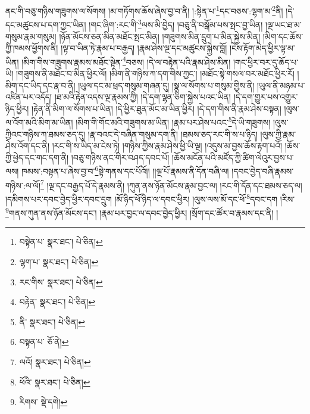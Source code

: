ནང་གི་བཅུ་གཉིས་གཟུགས་ལ་སོགས། །མ་གཏོགས་ཆོས་ཞེས་བྱ་བ་ནི། །:སྟེན་པ་\footnote{བསྟེན་པ་  སྣར་ཐང་།  པེ་ཅིན། }དང་བཅས་:ལྷག་མ་\footnote{ལྷག་པ་  སྣར་ཐང་།  པེ་ཅིན། }ནི། །དེ་དང་མཚུངས་པ་དག་ཀྱང་ཡིན། །གང་ཞིག་:རང་གི་\footnote{རང་གིས་  སྣར་ཐང་།  པེ་ཅིན། }ལས་མི་བྱེད། །བཅུ་ནི་བསྒོམ་པས་སྤང་བྱ་ཡིན། །ལྔ་ཡང་ཐ་མ་གསུམ་རྣམ་གསུམ། །ཉོན་མོངས་ཅན་མིན་མཐོང་སྤང་མིན། །གཟུགས་མིན་དྲུག་པ་མིན་སྐྱེས་མིན། །མིག་དང་ཆོས་ཀྱི་ཁམས་ཕྱོགས་ནི། །ལྟ་བ་ཡིན་ཏེ་རྣམ་པ་བརྒྱད། །རྣམ་ཤེས་ལྔ་དང་མཚུངས་སྐྱེས་བློ། །ངེས་རྟོག་མེད་ཕྱིར་ལྟ་མ་ཡིན། །མིག་གིས་གཟུགས་རྣམས་མཐོང་སྟེན་\footnote{བརྟེན་  སྣར་ཐང་།  པེ་ཅིན། }བཅས། །དེ་ལ་བརྟེན་པའི་རྣམ་ཤེས་མིན། །གང་ཕྱིར་བར་དུ་ཆོད་པ་ཡི། །གཟུགས་ནི་མཐོང་བ་མིན་ཕྱིར་ལོ། །མིག་ནི་གཉིས་ཀ་དག་གིས་ཀྱང་། །མཐོང་སྟེ་གསལ་བར་མཐོང་ཕྱིར་རོ། །མིག་དང་ཡིད་དང་རྣ་བ་ནི། །ཡུལ་དང་མ་ཕྲད་གསུམ་གཞན་དུ། །སྣ་ལ་སོགས་པ་གསུམ་གྱིས་ནི། །ཡུལ་ནི་མཉམ་པ་འཛིན་པར་འདོད། །ཐ་མའི་རྟེན་འདས་ལྔ་རྣམས་ཀྱི། །དེ་དག་ལྷན་ཅིག་སྐྱེས་པའང་ཡིན། །དེ་དག་གྱུར་པས་འགྱུར་ཉིད་ཕྱིར། །རྟེན་ནི་མིག་ལ་སོགས་པ་ཡིན། །དེ་ཕྱིར་ཐུན་མོང་མ་ཡིན་ཕྱིར། །དེ་དག་གིས་ནི་རྣམ་ཤེས་བསྟན། །ལུས་ལ་འོག་མའི་མིག་མ་ཡིན། །མིག་གི་གོང་མའི་གཟུགས་མ་ཡིན། །རྣམ་པར་ཤེས་པའང་\footnote{ནི་  སྣར་ཐང་།  པེ་ཅིན། }དེ་ཡི་གཟུགས། །ལུས་ཀྱིའང་གཉིས་ཀ་ཐམས་ཅད་དུ། །རྣ་བའང་དེ་བཞིན་གསུམ་དག་ནི། །ཐམས་ཅད་རང་གི་ས་པ་ཉིད། །ལུས་ཀྱི་རྣམ་ཤེས་འོག་དང་ནི། །རང་གི་ས་ཡིད་མ་ངེས་ཏེ། །གཉིས་ཀྱིས་རྣམ་ཤེས་ཕྱི་ཡི་ལྔ། །འདུས་མ་བྱས་ཆོས་རྟག་པའོ། །ཆོས་ཀྱི་ཕྱེད་དང་གང་དག་ནི། །བཅུ་གཉིས་ནང་གིར་བཤད་དབང་པོ། །ཆོས་མངོན་པའི་མཛོད་ཀྱི་ཚིག་ལེའུར་བྱས་པ་ལས། ཁམས་:བསྟན་པ་ཞེས་བྱ་བ་\footnote{བསྟན་པ་  ཅོ་ནེ། }སྟེ་གནས་དང་པོའོ།། །།ལྔ་པོ་རྣམས་ནི་དོན་བཞི་ལ། །དབང་བྱེད་བཞི་རྣམས་གཉིས་:ལ་ལོ།\footnote{ལའོ།  སྣར་ཐང་།  པེ་ཅིན། } །ལྔ་དང་བརྒྱད་པོ་དེ་རྣམས་ནི། །ཀུན་ནས་ཉོན་མོངས་རྣམ་བྱང་ལ། །རང་གི་དོན་དང་ཐམས་ཅད་ལ། །དམིགས་པར་དབང་བྱེད་ཕྱིར་དབང་དྲུག །མོ་ཉིད་ཕོ་ཉིད་ལ་དབང་ཕྱིར། །ལུས་ལས་མོ་དང་ཕོ་\footnote{ཕོའི་  སྣར་ཐང་།  པེ་ཅིན། }དབང་དག །རིས་\footnote{རིགས་  སྡེ་དགེ། }གནས་ཀུན་ནས་ཉོན་མོངས་དང་། །རྣམ་པར་བྱང་ལ་དབང་བྱེད་ཕྱིར། །སྲོག་དང་ཚོར་བ་རྣམས་དང་ནི། །
